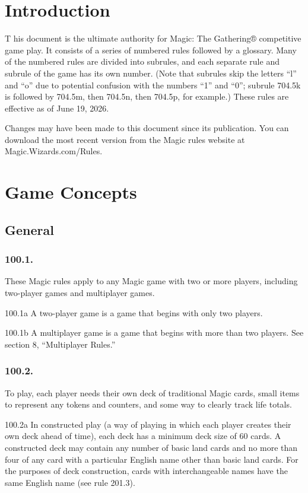 	\chapter*{Introduction}
\lettrine[lines=3, depth=0]{T}{ } his document is the ultimate authority for Magic: The Gathering® competitive game play. It consists of a series of numbered rules followed by a glossary. Many of the numbered rules are divided into subrules, and each separate rule and subrule of the game has its own number. (Note that subrules skip the letters “l” and “o” due to potential confusion with the numbers “1” and “0”; subrule 704.5k is followed by 704.5m, then 704.5n, then 704.5p, for example.) These rules are effective as of June 19, 2026.

Changes may have been made to this document since its publication. You can download the most recent version from the Magic rules website at Magic.Wizards.com/Rules.

\chapter{Game Concepts}
\setcounter{section}{99}
\section{General}
\subsection*{100.1.}
These Magic rules apply to any Magic game with two or more players, including two-player games and multiplayer games.

100.1a A two-player game is a game that begins with only two players.

100.1b A multiplayer game is a game that begins with more than two players. See section 8, “Multiplayer Rules.”

\subsection*{100.2.}
To play, each player needs their own deck of traditional Magic cards, small items to represent any tokens and counters, and some way to clearly track life totals.

100.2a In constructed play (a way of playing in which each player creates their own deck ahead of time), each deck has a minimum deck size of 60 cards. A constructed deck may contain any number of basic land cards and no more than four of any card with a particular English name other than basic land cards. For the purposes of deck construction, cards with interchangeable names have the same English name (see rule 201.3).

